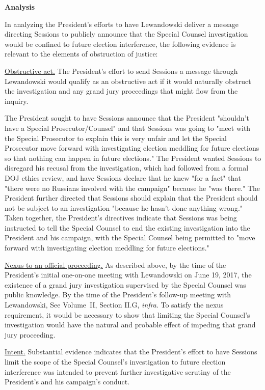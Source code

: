 {\begin{center}
\textbf{Analysis}
\end{center}

In analyzing the President's efforts to have Lewandowski deliver a message directing Sessions to publicly announce that the Special Counsel investigation would be confined to future election interference, the following evidence is relevant to the elements of obstruction of justice:

\underline{Obstructive act.}
The President's effort to send Sessions a message through Lewandowski would qualify as an obstructive act if it would naturally obstruct the investigation and any grand jury proceedings that might flow from the inquiry.

The President sought to have Sessions announce that the President "shouldn't have a Special Prosecutor/Counsel" and that Sessions was going to "meet with the Special Prosecutor to explain this is very unfair and let the Special Prosecutor move forward with investigating election meddling for future elections so that nothing can happen in future elections."
The President wanted Sessions to disregard his recusal from the investigation, which had followed from a formal DOJ ethics review, and have Sessions declare that he knew "for a fact" that "there were no Russians involved with the campaign" because he "was there."
The President further directed that Sessions should explain that the President should not be subject to an investigation "because he hasn't done anything wrong."
Taken together, the President's directives indicate that Sessions was being instructed to tell the Special Counsel to end the existing investigation into the President and his campaign, with the Special Counsel being permitted to "move forward with investigating election meddling for future elections."

\underline{Nexus to an official proceeding.}
As described above, by the time of the President's initial one-on-one meeting with Lewandowski on June 19, 2017, the existence of a grand jury investigation supervised by the Special Counsel was public knowledge.
By the time of the President's follow-up meeting with Lewandowski, 
See Volume~II, Section II.G, \textit{infra}.
To satisfy the nexus requirement, it would be necessary to show that limiting the Special Counsel's investigation would have the natural and probable effect of impeding that grand jury proceeding.

\underline{Intent.}
Substantial evidence indicates that the President's effort to have Sessions limit the scope of the Special Counsel's investigation to future election interference was intended to prevent further investigative scrutiny of the President's and his campaign's conduct.

}
